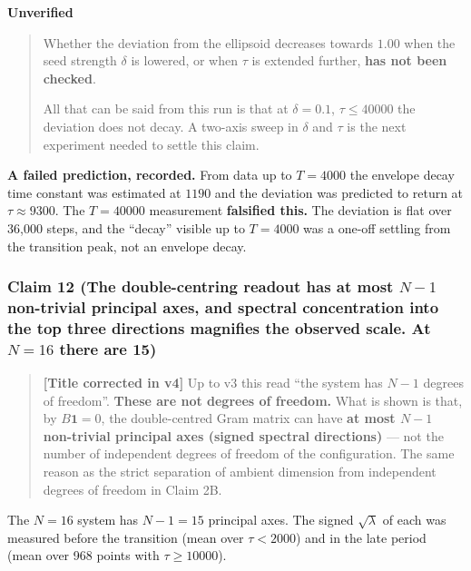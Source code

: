\documentclass[
  10pt,
]{article}
\begin{document}
\textbf{Unverified}

\begin{quote}
Whether the deviation from the ellipsoid decreases towards \(1.00\) when
the seed strength \(\delta\) is lowered, or when \(\tau\) is extended
further, \textbf{has not been checked}.

All that can be said from this run is that at \(\delta=0.1\),
\(\tau\le40000\) the deviation does not decay. A two-axis sweep in
\(\delta\) and \(\tau\) is the next experiment needed to settle this
claim.
\end{quote}

\textbf{A failed prediction, recorded.} From data up to \(T=4000\) the
envelope decay time constant was estimated at \(1190\) and the deviation
was predicted to return at \(\tau\approx9300\). The \(T=40000\)
measurement \textbf{falsified this.} The deviation is flat over 36,000
steps, and the ``decay'' visible up to \(T=4000\) was a one-off settling
from the transition peak, not an envelope decay.

\subsubsection{\texorpdfstring{Claim 12 (The double-centring readout has
at most \(N-1\) non-trivial principal axes, and spectral concentration
into the top three directions magnifies the observed scale. At \(N=16\)
there are
15)}{Claim 12 (The double-centring readout has at most N-1 non-trivial principal axes, and spectral concentration into the top three directions magnifies the observed scale. At N=16 there are 15)}}\label{claim-12-the-double-centring-readout-has-at-most-n-1-non-trivial-principal-axes-and-spectral-concentration-into-the-top-three-directions-magnifies-the-observed-scale.-at-n16-there-are-15}

\begin{quote}
\textbf{{[}Title corrected in v4{]}} Up to v3 this read ``the system has
\(N-1\) degrees of freedom''. \textbf{These are not degrees of freedom.}
What is shown is that, by \(B\mathbf{1}=0\), the double-centred Gram
matrix can have \textbf{at most \(N-1\) non-trivial principal axes
(signed spectral directions)} --- not the number of independent degrees
of freedom of the configuration. The same reason as the strict
separation of ambient dimension from independent degrees of freedom in
Claim 2B.
\end{quote}

The \(N=16\) system has \(N-1=15\) principal axes. The signed
\(\sqrt{\lambda}\) of each was measured before the transition (mean over
\(\tau<2000\)) and in the late period (mean over 968 points with
\(\tau\ge10000\)).
\end{document}
